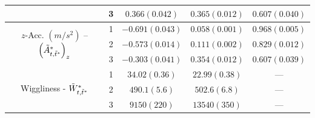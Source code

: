 \begin{table}[ht]
{\begin{tabular}{ccccc}
                                                                                       & 3                                    & $0.366 (0.042)$ & $0.365 (0.012)$ & $0.607 (0.040)$ \\ \hline
        \multirow{3}{*}{$z$-Acc. $(m/s^2)$ -- $\left(\tilde{A}^*_{t,\tilde t^*}\right)_z$}   & 1                                    & $-0.691 (0.043)$ & $0.058 (0.001)$ & $0.968 (0.005)$ \\
                                                                                       & 2                                    & $-0.573 (0.014)$ & $0.111 (0.002)$ & $0.829 (0.012)$ \\
                                                                                       & 3                                    & $-0.303 (0.041)$ & $0.354 (0.012)$ & $0.607 (0.039)$ \\ \hline
        \multirow{3}{*}{Wiggliness - $\tilde{W}^*_{t,\tilde t^*}$}                           & 1                                    & $34.02 (0.36)$ & $22.99 (0.38)$ & ---           \\
                                                                                       & 2                                    & $490.1 (5.6)$ & $502.6 (6.8)$ & ---           \\
                                                                                       & 3                                    & $9150 (220)$ & $13540 (350)$ & ---           \\ \hline
        \end{tabular}
    }
    \label{table:emis_dists_CarHHMM-DFT}
\end{table}

